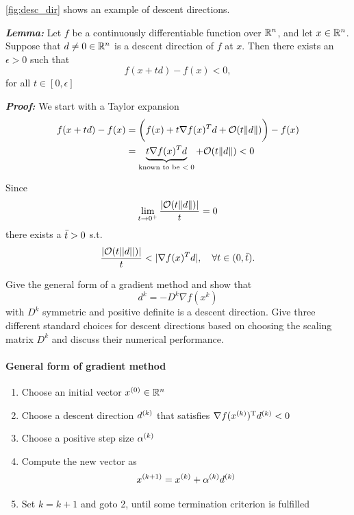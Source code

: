 \documentclass[12pt,a4paper]{article}
\begin{document}
  \autoref{fig:desc_dir} shows an example of descent directions.
  
\textbf{\textit{Lemma:}} Let $f$ be a continuously differentiable function over $\RR^n$, and let $x \in \RR^n$. Suppose that $d \neq 0 \in \RR^n$ is a descent direction of $f$ at $x$. Then there exists an $\epsilon > 0$ such that
  \begin{equation*}
      f(x + td) - f(x) < 0,
  \end{equation*}
    for all $t \in [0,\epsilon]$
    
\textbf{\textit{Proof:}} We start with a Taylor expansion
    \begin{align}
    f(x +td) - f(x)  &= \biggl(f(x) + t\nabla f(x)^T d + \mathcal{O}(t\norm{d})\biggr) - f(x)
    \\ &=   \underbrace{t\nabla f(x)^T d}_{\text{known to be $< 0$}} + \mathcal{O}(t\norm{d}) < 0
    \end{align}
    
    Since
    \begin{equation*}
        \lim\limits_{t \to 0^{+}}\frac{|\mathcal{O}(t\norm{d})|}{t} = 0
    \end{equation*}
    there exists a $\Bar{t} > 0$ s.t.
    \begin{equation*}
        \frac{|\mathcal{O}(t||d||)|}{t} < |\nabla f(x)^T d|, \quad \forall t \in (0, \Bar{t}).
    \end{equation*}

\begin{question}
 Give the general form of a gradient method and show that 
  \begin{equation*} 
    d^k = -D^k \nabla f(x^k) 
  \end{equation*}
 with $D^{k}$ symmetric and positive definite is a descent
 direction. Give three different standard choices for
 descent directions based on choosing the scaling matrix $D^{k}$ and discuss their numerical performance.
 \end{question}

\paragraph{General form of gradient method} 
\begin{enumerate}
  \item Choose an initial vector \(\kth[0]{x} \in \RR^n\)
  \item Choose a descent direction \(\kth{d}\) that satisfies \(\T{\nabla f(\kth{x})} \kth{d} < 0\)
  \item Choose a positive step size \(\kth{\alpha}\)
  \item Compute the new vector as
  \begin{equation*}
    \kth[k+1]{x} = \kth{x} + \kth{\alpha} \kth{d}
  \end{equation*}
  \item Set \(k = k + 1\) and goto 2, until some termination criterion is fulfilled
\end{enumerate}
\end{document}
